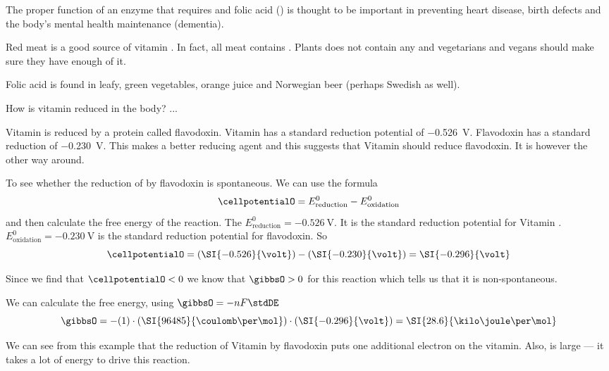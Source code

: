 \documentclass[../mit-general-chemistry.tex]{subfiles}
\begin{document}
The proper function of an enzyme that requires  and folic acid
() is thought to be important in preventing heart disease,
birth defects and the body's mental health maintenance (dementia).

Red meat is a good source of vitamin . In fact, all meat
contains . Plants does not contain any  and
vegetarians and vegans should make sure they have enough of it.

Folic acid is found in leafy, green vegetables, orange juice and
Norwegian beer (perhaps Swedish as well).

How is vitamin  reduced in the body? ...


Vitamin  is reduced by a protein called flavodoxin. Vitamin
 has a standard reduction potential of
\SI{-0.526}{\volt}. Flavodoxin has a standard reduction of
\SI{-0.230}{\volt}. This makes  a better reducing agent and
this suggests that Vitamin  should reduce flavodoxin. It is
however the other way around.

To see whether the reduction of  by flavodoxin is
spontaneous. We can use the formula
\begin{equation}
  \cellpotentialO = E^0_{\text{reduction}} - E^0_{\text{oxidation}}
\end{equation}
and then calculate the free energy of the reaction. The
$E^0_{\text{reduction}} = \SI{-0.526}{\volt}$. It is the standard
reduction potential for Vitamin . $E^0_{\text{oxidation}} =
\SI{-0.230}{\volt}$ is the standard reduction potential for
flavodoxin. So 
\begin{equation}
  \cellpotentialO = (\SI{-0.526}{\volt}) - (\SI{-0.230}{\volt}) = \SI{-0.296}{\volt}
\end{equation}

Since we find that $\cellpotentialO < 0$ we know that $\gibbsO > 0$ for
this reaction which tells us that it is non-spontaneous.

We can calculate the free energy, using $\gibbsO = -nF\stdDE$
\begin{equation}
  \gibbsO = -(1)\cdot(\SI{96485}{\coulomb\per\mol})\cdot(\SI{-0.296}{\volt})
  = \SI{28.6}{\kilo\joule\per\mol}
\end{equation}

We can see from this example that the reduction of Vitamin  by
flavodoxin puts one additional electron on the vitamin. Also, \gibbsO
is large --- it takes a lot of energy to drive this reaction.
\end{document}
